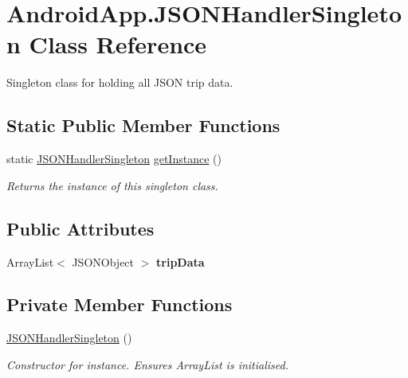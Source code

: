 \hypertarget{class_android_app_1_1_j_s_o_n_handler_singleton}{}\section{Android\+App.\+J\+S\+O\+N\+Handler\+Singleton Class Reference}
\label{class_android_app_1_1_j_s_o_n_handler_singleton}


Singleton class for holding all J\+S\+ON trip data.  


\subsection*{Static Public Member Functions}
\begin{DoxyCompactItemize}
\item 
static \hyperlink{class_android_app_1_1_j_s_o_n_handler_singleton}{J\+S\+O\+N\+Handler\+Singleton} \hyperlink{class_android_app_1_1_j_s_o_n_handler_singleton_a6b33b2582b9625f9ab0718013daa1aeb}{get\+Instance} ()
\begin{DoxyCompactList}\small\item\em Returns the instance of this singleton class. \end{DoxyCompactList}\end{DoxyCompactItemize}
\subsection*{Public Attributes}
\begin{DoxyCompactItemize}
\item 
\mbox{\label{class_android_app_1_1_j_s_o_n_handler_singleton_ae4f5359d481ba862a6e77b9ec04615ee}} 
Array\+List$<$ J\+S\+O\+N\+Object $>$ {\bfseries trip\+Data}
\end{DoxyCompactItemize}
\subsection*{Private Member Functions}
\begin{DoxyCompactItemize}
\item 
\mbox{\label{class_android_app_1_1_j_s_o_n_handler_singleton_a458ec5f08bf2da81be6dc852a065fcc2}} 
\hyperlink{class_android_app_1_1_j_s_o_n_handler_singleton_a458ec5f08bf2da81be6dc852a065fcc2}{J\+S\+O\+N\+Handler\+Singleton} ()
\begin{DoxyCompactList}\small\item\em Constructor for instance. Ensures Array\+List is initialised. \end{DoxyCompactList}\end{DoxyCompactItemize}
